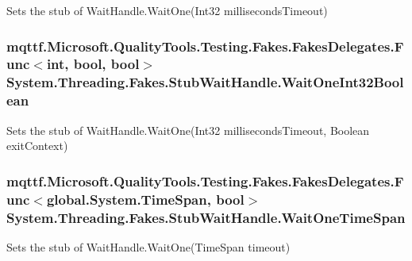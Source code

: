 Sets the stub of Wait\-Handle.\-Wait\-One(\-Int32 milliseconds\-Timeout)

\hypertarget{class_system_1_1_threading_1_1_fakes_1_1_stub_wait_handle_a3c4acf5e97de622dabea38338fb41244}{
\subsubsection[{Wait\-One\-Int32\-Boolean}]{\setlength{\rightskip}{0pt plus 5cm}mqttf.\-Microsoft.\-Quality\-Tools.\-Testing.\-Fakes.\-Fakes\-Delegates.\-Func$<$int, bool, bool$>$ System.\-Threading.\-Fakes.\-Stub\-Wait\-Handle.\-Wait\-One\-Int32\-Boolean}}\label{class_system_1_1_threading_1_1_fakes_1_1_stub_wait_handle_a3c4acf5e97de622dabea38338fb41244}


Sets the stub of Wait\-Handle.\-Wait\-One(\-Int32 milliseconds\-Timeout, Boolean exit\-Context)

\hypertarget{class_system_1_1_threading_1_1_fakes_1_1_stub_wait_handle_a0eb1041568164752e0c0cd5e044d0f52}{
\subsubsection[{Wait\-One\-Time\-Span}]{\setlength{\rightskip}{0pt plus 5cm}mqttf.\-Microsoft.\-Quality\-Tools.\-Testing.\-Fakes.\-Fakes\-Delegates.\-Func$<$global.\-System.\-Time\-Span, bool$>$ System.\-Threading.\-Fakes.\-Stub\-Wait\-Handle.\-Wait\-One\-Time\-Span}}\label{class_system_1_1_threading_1_1_fakes_1_1_stub_wait_handle_a0eb1041568164752e0c0cd5e044d0f52}


Sets the stub of Wait\-Handle.\-Wait\-One(\-Time\-Span timeout)

